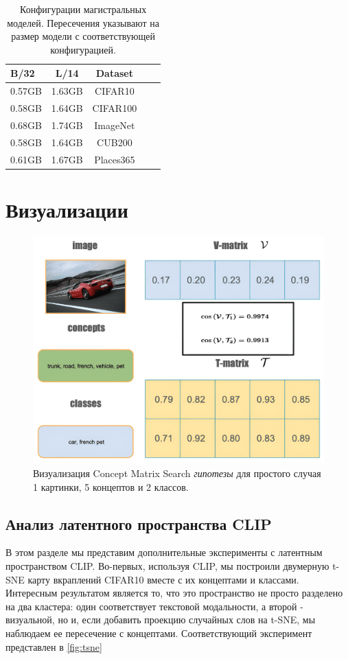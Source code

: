 \begin{table}[h]
\caption{Конфигурации магистральных моделей. Пересечения указывают на размер модели с соответствующей конфигурацией.}
\label{tab:backbone_nets}
\begin{center}
\begin{small}
\begin{sc}
\begin{tabular}{lcccr}
\toprule
B/32 & L/14 & Dataset   \\
\midrule
 0.57GB & 1.63GB &  CIFAR10 \\
 0.58GB& 1.64GB & CIFAR100 \\
 0.68GB &  1.74GB & ImageNet \\
 0.58GB& 1.64GB & CUB200 \\
 0.61GB& 1.67GB & Places365 \\
\bottomrule
\end{tabular}
\end{sc}
\end{small}
\end{center}
\end{table}

\section{Визуализации}
\begin{figure}[ht]
\begin{center}
\centerline{\includegraphics[width=0.5\columnwidth] {./figures/cms_example-compressed.png}} 
\caption{Визуализация Concept Matrix Search \textit{гипотезы} для простого случая 1 картинки, 5 концептов и 2 классов.}
\label{fig:cms_example}
\end{center}
\end{figure}

\subsection{Анализ латентного пространства CLIP}
В этом разделе мы представим дополнительные эксперименты с латентным пространством CLIP. Во-первых, используя CLIP, мы построили двумерную t-SNE карту вкраплений CIFAR10 вместе с их концептами и классами. Интересным результатом является то, что это пространство не просто разделено на два кластера: один соответствует текстовой модальности, а второй - визуальной, но и, если добавить проекцию случайных слов на t-SNE, мы наблюдаем ее пересечение с концептами. Соответствующий эксперимент представлен в \cref{fig:tsne}

